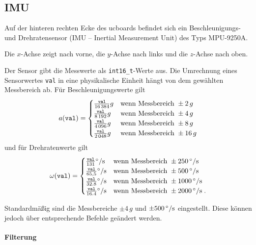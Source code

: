 \subsection{IMU}

Auf der hinteren rechten Ecke des ucboards befindet sich ein Beschleunigungs- und Drehratensensor (IMU -- Inertial Measurement Unit) des Typs MPU-9250A.

Die $x$-Achse zeigt nach vorne, die $y$-Achse nach links und die $z$-Achse nach oben.

Der Sensor gibt die Messwerte als \texttt{int16\_t}-Werte aus. Die Umrechnung eines Sensorwertes \texttt{val} in eine physikalische Einheit hängt von dem gewählten Messbereich ab. Für Beschleunigungswerte gilt
\begin{align*}
	a(\mathtt{val})
		=
			\begin{cases}
				\frac{\mathtt{val}}{16\,384} g & \textnormal{wenn Messbereich } \pm 2\,g \\
				\frac{\mathtt{val}}{8\,192} g & \textnormal{wenn Messbereich } \pm 4\,g \\
				\frac{\mathtt{val}}{4\,096} g & \textnormal{wenn Messbereich } \pm 8\,g \\
				\frac{\mathtt{val}}{2\,048} g & \textnormal{wenn Messbereich } \pm 16\,g 
			\end{cases}
\end{align*}
und für Drehratenwerte gilt
\begin{align*}
	\omega(\mathtt{val})
		=
			\begin{cases}
				\frac{\mathtt{val}}{131} \mrm{\degree / s} & \tn{wenn Messbereich } \pm \valunit{250}{\degree / s} \\
				\frac{\mathtt{val}}{65,5} \mrm{\degree / s} & \tn{wenn Messbereich } \pm \valunit{500}{\degree / s} \\
				\frac{\mathtt{val}}{32.8} \mrm{\degree / s} & \tn{wenn Messbereich } \pm \valunit{1000}{\degree / s} \\
				\frac{\mathtt{val}}{16.4} \mrm{\degree / s} & \tn{wenn Messbereich } \pm \valunit{2000}{\degree / s}\;.
			\end{cases}
\end{align*}

Standardmäßig sind die Messbereiche $\pm 4\,g$ und $\pm \valunit{500}{\degree / s}$ eingestellt. Diese können jedoch über entsprechende Befehle geändert werden.


\paragraph{Filterung}

